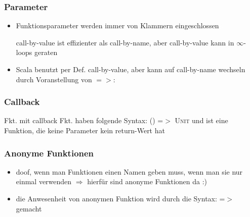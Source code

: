 \subsubsection{Parameter}
\begin{itemize}
  \item Funktionsparameter werden immer von Klammern eingeschlossen
  
  
  call-by-value ist effizienter als call-by-name, aber call-by-value
  kann in $\infty$-loops geraten
    
  \item Scala benutzt per Def. call-by-value, aber kann auf call-by-name
  wechseln durch Voranstellung von $=>$:
  
  
  
\end{itemize}


\subsubsection{Callback}
Fkt. mit callback Fkt. haben folgende Syntax: 
  \textsc{() =$>$ Unit} und ist eine Funktion, die keine Parameter \und 
  kein return-Wert hat
  
  


\subsubsection{Anonyme Funktionen}
\begin{itemize}
  \item doof, wenn man Funktionen einen Namen geben muss, wenn man sie
  nur einmal verwenden $\Rightarrow$ hierfür sind anonyme Funktionen da :)
  \item die Anwesenheit von anonymen Funktion wird durch die Syntax:
  \textsc{=$>$} gemacht
  
  
\end{itemize}


